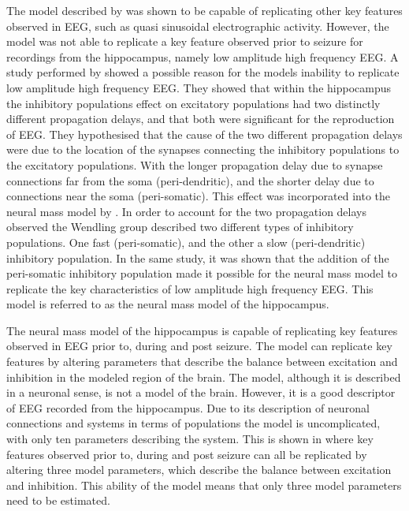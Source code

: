 The model described by \cite{jansen1995electroencephalogram} was shown to be capable of replicating other key features observed in EEG, such as quasi sinusoidal electrographic activity. However, the model was not able to replicate a key feature observed prior to seizure for recordings from the hippocampus, namely low amplitude high frequency EEG. A study performed by \cite{white2000networks} showed a possible reason for the models inability to replicate low amplitude high frequency EEG. They showed that within the hippocampus the inhibitory populations effect on excitatory populations had two distinctly different propagation delays, and that both were significant for the reproduction of EEG. They hypothesised that the cause of the two different propagation delays were due to the location of the synapses connecting the inhibitory populations to the excitatory populations. With the longer propagation delay due to synapse connections far from the soma (peri-dendritic), and the shorter delay due to connections near the soma (peri-somatic).  This effect was incorporated into the neural mass model by \cite{wendling2002epileptic}. In order to account for the two propagation delays observed the Wendling group described two different types of inhibitory populations. One fast (peri-somatic), and the other a slow (peri-dendritic) inhibitory population. In the same study, it was shown that the addition of the peri-somatic inhibitory population made it possible for the neural mass model to replicate the key characteristics of low amplitude high frequency EEG. This model is referred to as the neural mass model of the hippocampus.


The neural mass model of the hippocampus is capable of replicating key features observed in EEG prior to, during and post seizure. The model can replicate key features by altering parameters that describe the balance between excitation and inhibition in the modeled region of the brain. The model, although it is described in a neuronal sense, is not a model of the brain. However, it is a good descriptor of EEG recorded from the hippocampus. Due to its description of neuronal connections and systems in terms of populations the model is uncomplicated, with only ten parameters describing the system. This is shown in \cite{wendling2002epileptic} where key features observed prior to, during and post seizure can all be replicated by altering three model parameters, which describe the balance between excitation and inhibition. This ability of the model means that only three model parameters need to be estimated.

